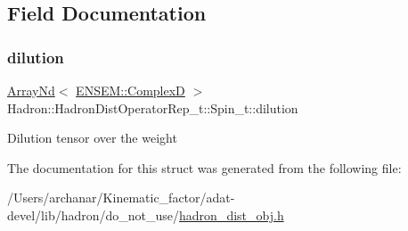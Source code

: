 \subsection{Field Documentation}
\mbox{\label{structHadron_1_1HadronDistOperatorRep__t_1_1Spin__t_a91819e69f7bb0289f5ad487af94bed39}} 
\subsubsection{\texorpdfstring{dilution}{dilution}}
{\footnotesize\ttfamily \mbox{\hyperlink{classADAT_1_1ArrayNd}{Array\+Nd}}$<$ \mbox{\hyperlink{group__defs_gaf38ee8c84f090ee0c3b76e7a384fb316}{E\+N\+S\+E\+M\+::\+ComplexD}} $>$ Hadron\+::\+Hadron\+Dist\+Operator\+Rep\+\_\+t\+::\+Spin\+\_\+t\+::dilution}

Dilution tensor over the weight 

The documentation for this struct was generated from the following file\+:\begin{DoxyCompactItemize}
\item 
/\+Users/archanar/\+Kinematic\+\_\+factor/adat-\/devel/lib/hadron/do\+\_\+not\+\_\+use/\mbox{\hyperlink{adat-devel_2lib_2hadron_2do__not__use_2hadron__dist__obj_8h}{hadron\+\_\+dist\+\_\+obj.\+h}}\end{DoxyCompactItemize}
